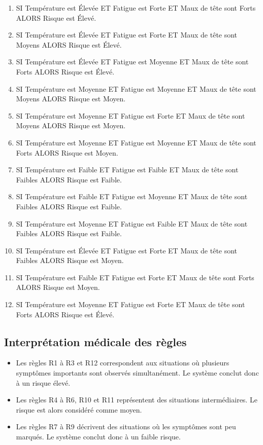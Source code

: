 \documentclass[a4paper,12pt]{report} %
\begin{document}
\begin{enumerate}
\item SI Température est Élevée ET Fatigue est Forte ET Maux de tête sont Forts ALORS Risque est Élevé.
\item SI Température est Élevée ET Fatigue est Forte ET Maux de tête sont Moyens ALORS Risque est Élevé.
\item SI Température est Élevée ET Fatigue est Moyenne ET Maux de tête sont Forts ALORS Risque est Élevé.
\item SI Température est Moyenne ET Fatigue est Moyenne ET Maux de tête sont Moyens ALORS Risque est Moyen.
\item SI Température est Moyenne ET Fatigue est Forte ET Maux de tête sont Moyens ALORS Risque est Moyen.
\item SI Température est Moyenne ET Fatigue est Moyenne ET Maux de tête sont Forts ALORS Risque est Moyen.
\item SI Température est Faible ET Fatigue est Faible ET Maux de tête sont Faibles ALORS Risque est Faible.
\item SI Température est Faible ET Fatigue est Moyenne ET Maux de tête sont Faibles ALORS Risque est Faible.
\item SI Température est Moyenne ET Fatigue est Faible ET Maux de tête sont Faibles ALORS Risque est Faible.
\item[10.] SI Température est Élevée ET Fatigue est Forte ET Maux de tête sont Faibles ALORS Risque est Moyen.
\item[11.] SI Température est Faible ET Fatigue est Forte ET Maux de tête sont Forts ALORS Risque est Moyen.
\item[12.] SI Température est Moyenne ET Fatigue est Forte ET Maux de tête sont Forts ALORS Risque est Élevé.
\end{enumerate}

\subsection{Interprétation médicale des règles}

\begin{itemize}
\item Les règles R1 à R3 et R12 correspondent aux situations où plusieurs symptômes importants sont observés simultanément. Le système conclut donc à un risque élevé.
\item Les règles R4 à R6, R10 et R11 représentent des situations intermédiaires. Le risque est alors considéré comme moyen.
\item Les règles R7 à R9 décrivent des situations où les symptômes sont peu marqués. Le système conclut donc à un faible risque.
\end{itemize}
\end{document}
